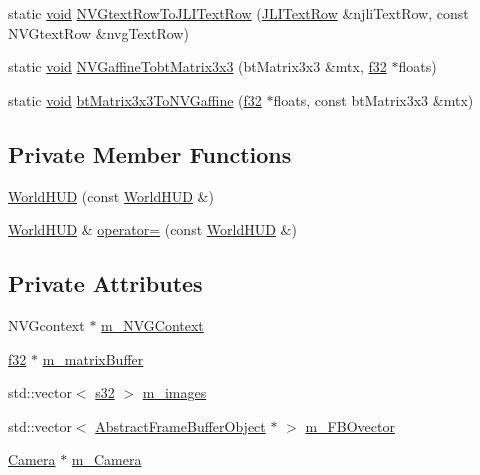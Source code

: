 \begin{DoxyCompactItemize}
\item 
static \mbox{\hyperlink{_thread_8h_af1e856da2e658414cb2456cb6f7ebc66}{void}} \mbox{\hyperlink{classnjli_1_1_world_h_u_d_a4ab78ad7055377d623e1cd28a4aca545}{N\+V\+Gtext\+Row\+To\+J\+L\+I\+Text\+Row}} (\mbox{\hyperlink{structnjli_1_1_j_l_i_text_row}{J\+L\+I\+Text\+Row}} \&njli\+Text\+Row, const N\+V\+Gtext\+Row \&nvg\+Text\+Row)
\item 
static \mbox{\hyperlink{_thread_8h_af1e856da2e658414cb2456cb6f7ebc66}{void}} \mbox{\hyperlink{classnjli_1_1_world_h_u_d_a8a6886fa7797f7da9a84e61ec538a86d}{N\+V\+Gaffine\+Tobt\+Matrix3x3}} (bt\+Matrix3x3 \&mtx, \mbox{\hyperlink{_util_8h_a5f6906312a689f27d70e9d086649d3fd}{f32}} $\ast$floats)
\item 
static \mbox{\hyperlink{_thread_8h_af1e856da2e658414cb2456cb6f7ebc66}{void}} \mbox{\hyperlink{classnjli_1_1_world_h_u_d_ab29244172f9d3cfeee6f7e1483ce7300}{bt\+Matrix3x3\+To\+N\+V\+Gaffine}} (\mbox{\hyperlink{_util_8h_a5f6906312a689f27d70e9d086649d3fd}{f32}} $\ast$floats, const bt\+Matrix3x3 \&mtx)
\end{DoxyCompactItemize}
\subsection*{Private Member Functions}
\begin{DoxyCompactItemize}
\item 
\mbox{\hyperlink{classnjli_1_1_world_h_u_d_a5d7db06d3f35981665798e3dd5f1ddb6}{World\+H\+UD}} (const \mbox{\hyperlink{classnjli_1_1_world_h_u_d}{World\+H\+UD}} \&)
\item 
\mbox{\hyperlink{classnjli_1_1_world_h_u_d}{World\+H\+UD}} \& \mbox{\hyperlink{classnjli_1_1_world_h_u_d_a231ab1b0c3b57e374b906f55d4b5f5b7}{operator=}} (const \mbox{\hyperlink{classnjli_1_1_world_h_u_d}{World\+H\+UD}} \&)
\end{DoxyCompactItemize}
\subsection*{Private Attributes}
\begin{DoxyCompactItemize}
\item 
N\+V\+Gcontext $\ast$ \mbox{\hyperlink{classnjli_1_1_world_h_u_d_a08dbc205077c567128a8bc9c3d56fc3b}{m\+\_\+\+N\+V\+G\+Context}}
\item 
\mbox{\hyperlink{_util_8h_a5f6906312a689f27d70e9d086649d3fd}{f32}} $\ast$ \mbox{\hyperlink{classnjli_1_1_world_h_u_d_a35f13368cab9b866ea08ad9f0dc6cc13}{m\+\_\+matrix\+Buffer}}
\item 
std\+::vector$<$ \mbox{\hyperlink{_util_8h_aa62c75d314a0d1f37f79c4b73b2292e2}{s32}} $>$ \mbox{\hyperlink{classnjli_1_1_world_h_u_d_a5c267043670cc05af3e1b391af18cc54}{m\+\_\+images}}
\item 
std\+::vector$<$ \mbox{\hyperlink{classnjli_1_1_abstract_frame_buffer_object}{Abstract\+Frame\+Buffer\+Object}} $\ast$ $>$ \mbox{\hyperlink{classnjli_1_1_world_h_u_d_a40102c8e6ba84985645c942f75481197}{m\+\_\+\+F\+B\+Ovector}}
\item 
\mbox{\hyperlink{classnjli_1_1_camera}{Camera}} $\ast$ \mbox{\hyperlink{classnjli_1_1_world_h_u_d_a6ea154c63235e96fbd240cdd9c49dbcd}{m\+\_\+\+Camera}}
\end{DoxyCompactItemize}
